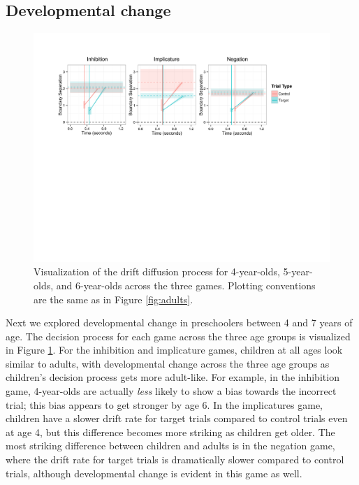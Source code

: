 \documentclass[10pt,letterpaper]{article}
\begin{document}
\subsection{Developmental change}

\begin{figure}
\begin{center} 
\includegraphics[width=6in]{figures/child_vis.pdf}
\caption{\label{fig:kids} Visualization of the drift diffusion process for 4-year-olds, 5-year-olds, and 6-year-olds across the three games.  Plotting conventions are the same as in Figure \ref{fig:adults}.}
\end{center} 
\end{figure}

Next we explored developmental change in preschoolers between 4 and 7 years of age.  The decision process for each game across the three age groups is visualized in Figure \ref{fig:kids}.  For the inhibition and implicature games, children at all ages look similar to adults, with developmental change across the three age groups as children's decision process gets more adult-like.  For example, in the inhibition game, 4-year-olds are actually \emph{less} likely to show a bias towards the incorrect trial; this bias appears to get stronger by age 6.  In the implicatures game, children have a slower drift rate for target trials compared to control trials even at age 4, but this difference becomes more striking as children get older.  The most striking difference between children and adults is in the negation game, where the drift rate for target trials is dramatically slower compared to control trials, although developmental change is evident in this game as well.  
\end{document}
